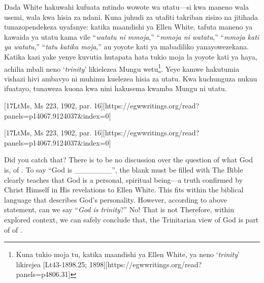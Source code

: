 Dada White hakuwahi kufuata mtindo wowote wa utatu—si kwa maneno wala usemi, wala kwa hisia za ndani. Kuna juhudi za utafiti takriban zisizo na jitihada tunazopendekeza uyafanye: katika maandishi ya Ellen White, tafuta maneno ya kawaida ya utatu kama vile “\textit{watatu ni mmoja},” “\textit{mmoja ni watatu},” “\textit{mmoja kati ya watatu},” “\textit{tatu katika moja},” au yoyote kati ya mabadiliko yanayowezekana. Katika kazi yake yenye kuvutia hutapata hata tukio moja la yoyote kati ya haya, achilia mbali neno ‘\textit{trinity}’ likielezea Mungu wetu\footnote{Kuna tukio moja tu, katika maandishi ya Ellen White, ya neno ‘\textit{trinity}’ likirejea [Lt43-1898.25; 1898][https://egwwritings.org/read?panels=p4806.31]}. Yeye kamwe hakutumia vishazi hivi ambavyo ni muhimu kuelezea hisia za utatu. Kwa kuchunguza nukuu ifuatayo, tunaweza kuona kwa nini hakusema kwamba Mungu ni utatu.


[17LtMs, Ms 223, 1902, par. 16][https://egwwritings.org/read?panels=p14067.9124037&index=0]


[17LtMs, Ms 223, 1902, par. 16][https://egwwritings.org/read?panels=p14067.9124037&index=0]


Did you catch that? There is to be no discussion over the question of what God is,  of . To say “God is \_\_\_\_\_\_\_”, the blank must be filled with  The Bible clearly teaches that God is a personal, spiritual being—a truth confirmed by Christ Himself in His revelations to Ellen White. This fits within the biblical language that describes God’s personality. However, according to above statement, can we say “\textit{God is trinity}?” No! That is not  Therefore, within explored context, we can safely conclude that, the Trinitarian view of God is part of  of .


